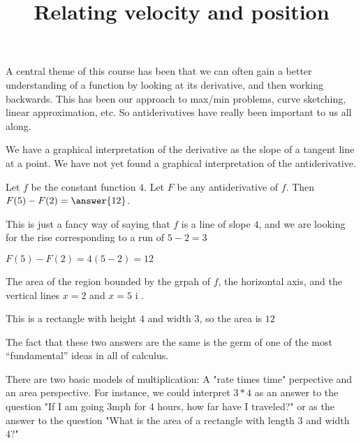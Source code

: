 \documentclass{ximera}
\title[Dig-In:]{Relating velocity and position}
\begin{document}
A central theme of this course has been that we can often gain a
better understanding of a function by looking at its derivative, and
then working backwards.  This has been our approach to max/min
problems, curve sketching, linear approximation, etc.  So
antiderivatives have really been important to us all along.

We have a graphical interpretation of the derivative as the slope of a
tangent line at a point.  We have not yet found a graphical
interpretation of the antiderivative.
\begin{question}
  \begin{question}
   Let $f$ be the constant function $4$. Let $F$ be any antiderivative
   of $f$.  Then $F(5)-F(2) = \answer{12}$.
   \begin{hint}
    This is just a fancy way of saying that $f$ is a line of slope
    $4$, and we are looking for the rise corresponding to a run of
    $5-2= 3$
   \end{hint}
   \begin{hint}
    $F(5) - F(2) = 4(5-2) = 12$
   \end{hint}
  \end{question}
  
  \begin{question}
    The area of the region bounded by the grpah of $f$, the horizontal
    axis, and the vertical lines $x=2$ and $x=5$ i .
    
    \begin{hint}
    \end{hint}
    \begin{hint}
      This is a rectangle with height $4$ and width $3$, so the area is $12$
    \end{hint}
  \end{question}
\end{question}

The fact that these two answers are the same is the germ of one of the
most ``fundamental'' ideas in all of calculus.

\begin{idea}
  There are two basic models of multiplication: A "rate times time"
  perpective and an area perspective.  For instance, we could
  interpret $3*4$ as an answer to the question "If I am going $3
  \textrm{mph}$ for $4$ hours, how far have I traveled?" or as the
  answer to the question "What is the area of a rectangle with length
  $3$ and width $4$?"
\end{idea}
\end{document}
